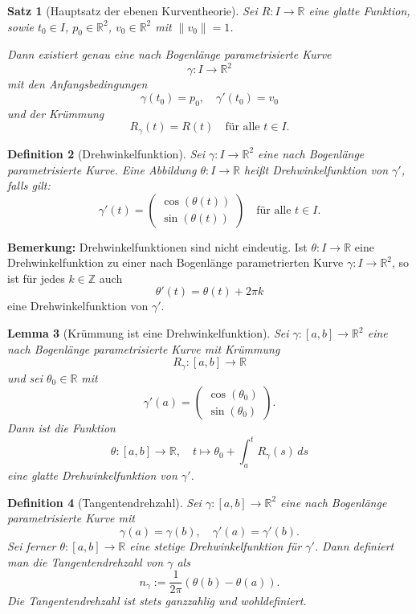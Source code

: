 \documentclass[a4paper,12pt]{article}
\theoremstyle{break}
\newtheorem{definition}{Definition}[section]
\newtheorem{theorem}[definition]{Satz}
\newtheorem{lemma}[definition]{Lemma}
\begin{document}
\begin{theorem}[Hauptsatz der ebenen Kurventheorie]
Sei \( R: I \to \mathbb{R} \) eine glatte Funktion, sowie  
\( t_0 \in I \), \( p_0 \in \mathbb{R}^2 \), \( v_0 \in \mathbb{R}^2 \) mit \( \|v_0\| = 1 \).  

Dann existiert genau eine nach Bogenlänge parametrisierte Kurve  
\[
\gamma: I \to \mathbb{R}^2
\]
mit den Anfangsbedingungen  
\[
\gamma(t_0) = p_0, \quad \gamma'(t_0) = v_0
\]
und der Krümmung  
\[
R_{\gamma}(t) = R(t) \quad \text{für alle } t \in I.
\]
\end{theorem}

\begin{definition}[Drehwinkelfunktion]
Sei \( \gamma: I \to \mathbb{R}^2 \) eine nach Bogenlänge parametrisierte Kurve.  
Eine Abbildung \( \theta: I \to \mathbb{R} \) heißt \emph{Drehwinkelfunktion} von \( \gamma' \), falls gilt:  
\[
\gamma'(t) = \begin{pmatrix} \cos(\theta(t)) \\ \sin(\theta(t)) \end{pmatrix}
\quad \text{für alle } t \in I.
\]
\end{definition}

\textbf{Bemerkung:}
Drehwinkelfunktionen sind nicht eindeutig.  
Ist \( \theta: I \to \mathbb{R} \) eine Drehwinkelfunktion zu einer nach Bogenlänge parametrierten Kurve  
\( \gamma: I \to \mathbb{R}^2 \), so ist für jedes \( k \in \mathbb{Z} \) auch  
\[
\theta'(t) = \theta(t) + 2\pi k
\]
eine Drehwinkelfunktion von \( \gamma' \).

\begin{lemma}[Krümmung ist eine Drehwinkelfunktion]
Sei \( \gamma: [a,b] \to \mathbb{R}^2 \) eine nach Bogenlänge parametrisierte Kurve mit Krümmung  
\[
R_{\gamma}: [a,b] \to \mathbb{R}
\]
und sei \( \theta_0 \in \mathbb{R} \) mit  
\[
\gamma'(a) = \begin{pmatrix} \cos(\theta_0) \\ \sin(\theta_0) \end{pmatrix}.
\]
Dann ist die Funktion  
\[
\theta: [a,b] \to \mathbb{R}, \quad t \mapsto \theta_0 + \int_a^t R_{\gamma}(s) \, ds
\]
eine glatte Drehwinkelfunktion von \( \gamma' \).
\end{lemma}

\begin{definition}[Tangentendrehzahl]
Sei \( \gamma: [a,b] \to \mathbb{R}^2 \) eine nach Bogenlänge parametrisierte Kurve mit  
\[
\gamma(a) = \gamma(b), \quad \gamma'(a) = \gamma'(b).
\]
Sei ferner \( \theta: [a,b] \to \mathbb{R} \) eine stetige Drehwinkelfunktion für \( \gamma' \).  
Dann definiert man die \emph{Tangentendrehzahl} von \( \gamma \) als  
\[
n_{\gamma} := \frac{1}{2\pi} (\theta(b) - \theta(a)).
\]
Die Tangentendrehzahl ist stets ganzzahlig und wohldefiniert.
\end{definition}
\end{document}

